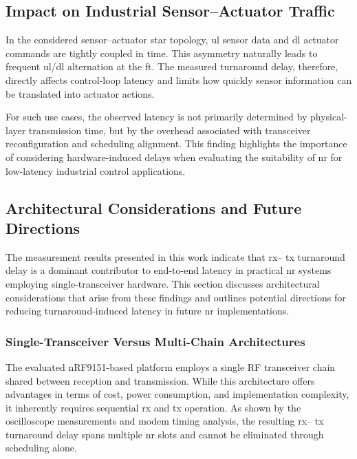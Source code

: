 \documentclass[conference]{IEEEtran}
\begin{document}
\subsection{Impact on Industrial Sensor--Actuator Traffic}

In the considered sensor--actuator star topology, \gls{ul} sensor data and \gls{dl} actuator commands are tightly coupled in time. This asymmetry naturally leads to frequent \gls{ul}/\gls{dl} alternation at the \gls{ft}. The measured turnaround delay, therefore, directly affects control-loop latency and limits how quickly sensor information can be translated into actuator actions.

For such use cases, the observed latency is not primarily determined by physical-layer transmission time, but by the overhead associated with transceiver reconfiguration and scheduling alignment. This finding highlights the importance of considering hardware-induced delays when evaluating the suitability of \gls{nr} for low-latency industrial control applications.

\subsection{Architectural Considerations and Future Directions}

The measurement results presented in this work indicate that  \gls{rx}-- \gls{tx} turnaround delay is a dominant contributor to end-to-end latency in practical \gls{nr} systems employing single-transceiver hardware. This section discusses architectural considerations that arise from these findings and outlines potential directions for reducing turnaround-induced latency in future \gls{nr} implementations.

\subsubsection{Single-Transceiver Versus Multi-Chain Architectures}

The evaluated nRF9151-based platform employs a single RF transceiver chain shared between reception and transmission. While this architecture offers advantages in terms of cost, power consumption, and implementation complexity, it inherently requires sequential  \gls{rx} and  \gls{tx} operation. As shown by the oscilloscope measurements and modem timing analysis, the resulting  \gls{rx}-- \gls{tx} turnaround delay spans multiple \gls{nr} slots and cannot be eliminated through scheduling alone.
\end{document}
